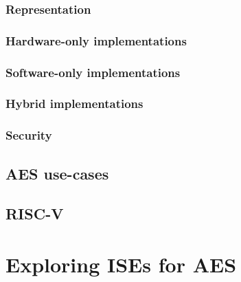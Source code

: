 \documentclass[preprint]{iacrtrans}
\begin{document}
\subsubsection{Representation}
\label{sec:bg:aes_impl_rep}


\subsubsection{Hardware-only implementations}
\label{sec:bg:aes_impl_hw}

\subsubsection{Software-only implementations}
\label{sec:bg:aes_impl_sw}

\subsubsection{Hybrid        implementations}
\label{sec:bg:aes_impl_ise}


\subsubsection{Security}
\label{sec:bg:aes_impl_sec}



\subsection{AES  use-cases}
\label{sec:bg:aes_usage}



\subsection{RISC-V}
\label{sec:bg:riscv}



\section{Exploring ISEs for AES}
\label{sec:ise}

\end{document}
